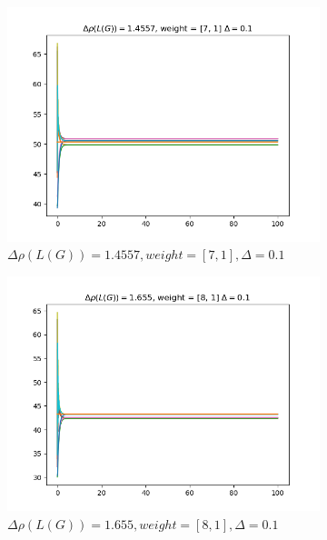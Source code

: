 \documentclass{article}
\begin{document}
\begin{problem}
\begin{figure}[!h]
\begin{subfigure}{0.4\textwidth}
            \includegraphics[width=\textwidth]{./img/Figure_6.png}
            \caption{$\Delta \rho (L(G)) = 1.4557, weight = [7,1], \Delta = 0.1$}
        \end{subfigure}
        \begin{subfigure}{0.4\textwidth}
            \includegraphics[width=\textwidth]{./img/Figure_7.png}
            \caption{$\Delta \rho (L(G)) = 1.655, weight = [8,1], \Delta = 0.1$}
        \end{subfigure}
        \begin{subfigure}{0.4\textwidth}

\end{subfigure}
\end{figure}
\end{problem}
\end{document}
